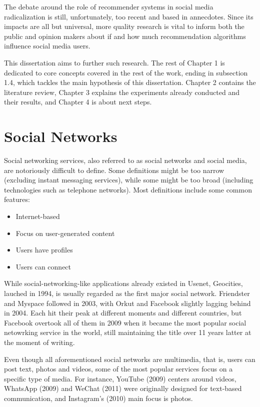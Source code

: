 The debate around the role of recommender systems in social media radicalization
is still, unfortunately, too recent and based in annecdotes. Since its impacts
are all but universal, more quality research is vital to inform both the public
and opinion makers about if and how much recommendation algorithms influence
social media users.

This dissertation aims to further such research. The rest of Chapter 1 is
dedicated to core concepts covered in the rest of the work, ending in subsection
1.4, which tackles the main hypothesis of this dissertation. Chapter 2 contains
the literature review, Chapter 3 explains the experiments already conducted and
their results, and Chapter 4 is about next steps.

\section{Social Networks}
\label{sec:social_networks}

Social networking services, also referred to as social networks and social
media, are notoriously difficult to define. Some definitions might be too narrow
(excluding instant messaging services), while some might be too broad (including
technologies such as telephone networks). Most definitions include some common
features:

\begin{itemize}
  \item Internet-based
  \item Focus on user-generated content
  \item Users have profiles
  \item Users can connect
\end{itemize}

While social-networking-like applications already existed in Usenet, Geocities,
lauched in 1994, is usually regarded as the first major social network.
Friendster and Myspace followed in 2003, with Orkut and Facebook slightly
lagging behind in 2004. Each hit their peak at different moments and different
countries, but Facebook overtook all of them in 2009 when it became the most
popular social netowrking service in the world, still maintaining the title over
11 years latter at the moment of writing.

Even though all aforementioned social networks are multimedia, that is, users
can post text, photos and videos, some of the most popular services focus on a
specific type of media. For instance, YouTube (2009) centers around videos,
WhatsApp (2009) and WeChat (2011) were originally designed for text-based
communication, and Instagram's (2010) main focus is photos.

